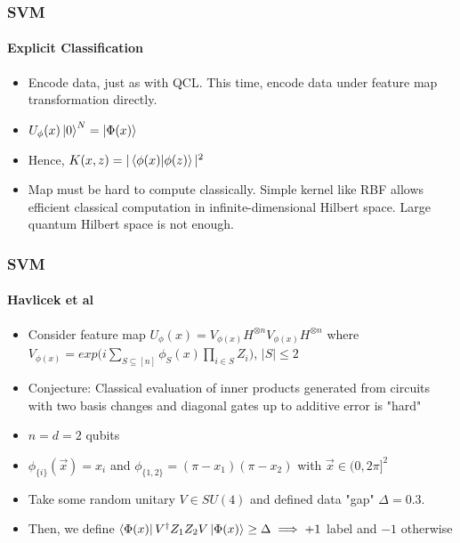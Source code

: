 \documentclass{beamer}
\newcommand\0{\mathbf{0}}
\begin{document}
	\begin{frame}
	\frametitle{SVM}
  	\framesubtitle{Explicit Classification}
	\begin{itemize}
	\item Encode data, just as with QCL. This time, encode data under feature map transformation directly.
	\item $U_\phi(x) \ket{0}^N = \ket{\Phi(x)}$
	\item Hence, $K(x, z) = |\bra{\phi(x)}\ket{\phi(z)}|^2$
	\item Map must be hard to compute classically. Simple kernel like RBF allows efficient classical computation in infinite-dimensional Hilbert space. Large quantum Hilbert space is not enough.
	\end{itemize}
	
	\end{frame}
	
	\begin{frame}
	\frametitle{SVM}
  	\framesubtitle{Havlicek et al}
	\begin{itemize}
	\item Consider feature map $U_{\phi}(x) = V_{\phi(x)}H^{\otimes n}V_{\phi(x)}H^{\otimes n}$ where $V_{\phi(x)} = exp\Big(i \sum\limits_{S\subseteq [n]} \phi_S(x) \prod_{i \in S} Z_i\Big)$,  $|S| \leq 2$
	\item Conjecture: Classical evaluation of inner products generated from circuits with two basis changes and diagonal gates up to additive error is "hard"
	\pause
	\item $n = d = 2$ qubits
	\item $\phi_{\{i\}}(\vec{x}) = x_i$ and $\phi_{\{1,2\}} = (\pi - x_1)(\pi - x_2)$ with $\vec{x} \in (0, 2\pi]^2$
	\item Take some random unitary $V \in SU(4)$ and defined data "gap" $\Delta = 0.3$. 
	\item Then, we define $\bra{\Phi(x)} V^\dag Z_1 Z_2 V \ket{\Phi(x)} \geq \Delta \implies +1$ label and $-1$ otherwise
	\end{itemize}
	\end{frame}
	
\end{document}
